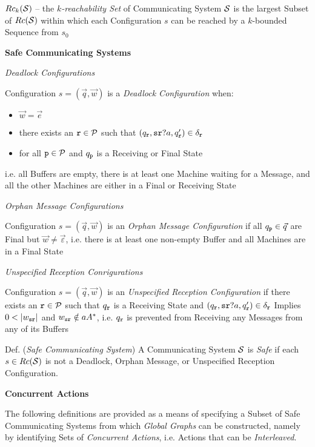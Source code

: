 $Rc_k(\mathcal{S})$ -- the \emph{$k$-reachability Set} of Communicating
System $\mathcal{S}$ is the largest Subset of $Rc(\mathcal{S})$ within
which each Configuration $s$ can be reached by a $k$-bounded Sequence
from $s_0$


\textbf{Safe Communicating Systems}

\emph{Deadlock Configurations}

Configuration $s = (\vec{q},\vec{w})$ is a \emph{Deadlock
  Configuration} when:
\begin{itemize}
  \item $\vec{w} = \vec{e}$
  \item there exists an $\mathtt{r} \in \mathcal{P}$ such that
    $(q_\mathtt{r},\mathtt{sr}?a,q_\mathtt{r}') \in \delta_\mathtt{r}$
  \item for all $\mathtt{p} \in \mathcal{P}$ and $q_\mathtt{p}$ is a
    Receiving or Final State
\end{itemize}
i.e. all Buffers are empty, there is at least one Machine waiting for
a Message, and all the other Machines are either in a Final or
Receiving State

\emph{Orphan Message Configurations}

Configuration $s = (\vec{q},\vec{w})$ is an \emph{Orphan Message
  Configuration} if all $q_\mathtt{p} \in \vec{q}$ are Final but
$\vec{w} \neq \vec{\varepsilon}$, i.e. there is at least one non-empty
Buffer and all Machines are in a Final State

\emph{Unspecified Reception Conrigurations}

Configuration $s = (\vec{q},\vec{w})$ is an \emph{Unspecified
  Reception Configuration} if there exists an $\mathtt{r} \in
\mathcal{P}$ such that $q_\mathtt{r}$ is a Receiving State and
$(q_\mathtt{r},\mathtt{sr}?a,q_\mathtt{r}') \in \delta_\mathtt{r}$ Implies
$0 < |w_\mathtt{sr}|$ and $w_\mathtt{sr} \notin aA^*$, i.e.
$q_\mathtt{r}$ is prevented from Receiving any Messages from any of its
Buffers %


Def. (\emph{Safe Communicating System}) A Communicating System
$\mathcal{S}$ is \emph{Safe} if each $s \in Rc(\mathcal{S})$ is not a
Deadlock, Orphan Message, or Unspecified Reception Configuration.


\textbf{Concurrent Actions}

The following definitions are provided as a means of specifying a
Subset of Safe Communicating Systems from which \emph{Global Graphs}
can be constructed, namely by identifying Sets of \emph{Concurrent
  Actions}, i.e. Actions that can be \emph{Interleaved}.

